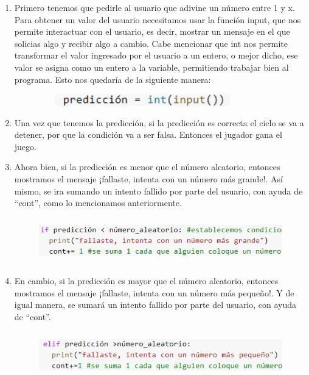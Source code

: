 \documentclass[a4paper,12pt]{article}
\begin{document}
\begin{enumerate}
    
    \item \large{Primero tenemos que pedirle al usuario que adivine un número entre 1 y x. Para obtener un valor del usuario necesitamos usar la función input, que nos permite interactuar con el usuario, es decir, mostrar un mensaje en el que solicias algo y recibir algo a cambio. Cabe mencionar   que int nos permite transformar el valor ingresado por el usuario a un entero, o mejor dicho, ese valor se asigna como un entero a la variable, permitiendo trabajar bien al programa. Esto nos quedaría de la siguiente manera:}
    
    \begin{figure}[H]
    \caption{}
    \centering \includegraphics[width=9cm, height=0.5cm]{a_11.png}
    \label{fig1:my_label}
    \end{figure}
    
    \item \large{Una vez que tenemos la predicción, si la predicción es correcta el ciclo se va a detener, por que la condición va a ser falsa. Entonces el jugador gana el juego.}

    
    \item \large{Ahora bien, si la predicción es menor que el número aleatorio, entonces mostramos el mensaje ¡fallaste, intenta con un número más grande!. Así mismo, se ira sumando un intento fallido por parte del usuario, con ayuda de ``cont'', como lo mencionamos anteriormente. }

    \begin{figure}[H]
    \caption{}
    \centering \includegraphics[width=12cm, height=2cm]{a_12.png}
    \label{fig1:my_label}
    \end{figure}    
    
    \item \large{En cambio, si la predicción es mayor que el número aleatorio, entonces mostramos el mensaje ¡fallaste, intenta con un número más pequeño!. Y de igual manera, se sumará un intento fallido por parte del usuario, con ayuda de ``cont''.}

    \begin{figure}[H]
    \caption{}
    \centering \includegraphics[width=12cm, height=2cm]{a_13.png}
    \label{fig1:my_label}
    \end{figure}  
    

\end{enumerate}
\end{document}
